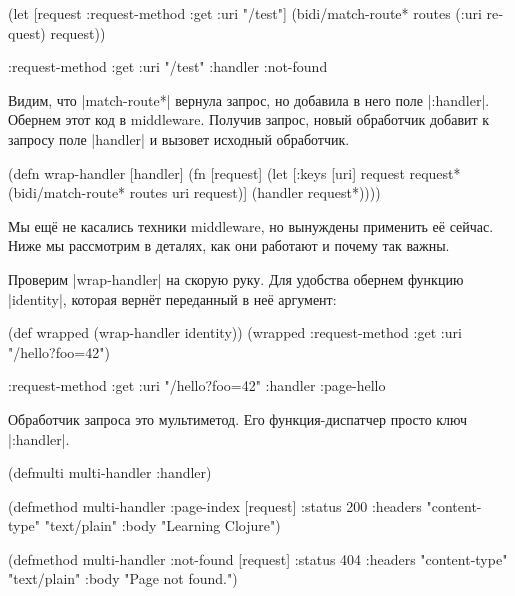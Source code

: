 \begin{english}
  \begin{clojure}
(let [request {:request-method :get
               :uri "/test"}]
  (bidi/match-route* routes (:uri request) request))

{:request-method :get
 :uri "/test"
 :handler :not-found}
  \end{clojure}
\end{english}

Видим, что \spverb|match-route*| вернула запрос, но добавила в него поле
\spverb|:handler|. Обернем этот код в middleware. Получив запрос, новый
обработчик добавит к запросу поле \spverb|handler| и вызовет исходный
обработчик.

\begin{english}
  \begin{clojure}
(defn wrap-handler [handler]
  (fn [request]
    (let [{:keys [uri]} request
          request* (bidi/match-route* routes uri request)]
      (handler request*))))
  \end{clojure}
\end{english}

Мы ещ\"{е} не касались техники middleware, но вынуждены применить е\"{е} сейчас. Ниже мы
рассмотрим в деталях, как они работают и почему так важны.

Проверим \spverb|wrap-handler| на скорую руку. Для удобства обернем функцию
\spverb|identity|, которая верн\"{е}т переданный в не\"{е} аргумент:

\begin{english}
  \begin{clojure}
(def wrapped (wrap-handler identity))
(wrapped {:request-method :get
          :uri "/hello?foo=42"})

{:request-method :get
 :uri "/hello?foo=42"
 :handler :page-hello}
  \end{clojure}
\end{english}


Обработчик запроса это мультиметод. Его функция-диспатчер просто ключ
\spverb|:handler|.

\begin{english}
  \begin{clojure}
(defmulti multi-handler :handler)

(defmethod multi-handler :page-index
  [request]
  {:status 200
   :headers {"content-type" "text/plain"}
   :body "Learning Clojure"})

(defmethod multi-handler :not-found
  [request]
  {:status 404
   :headers {"content-type" "text/plain"}
   :body "Page not found."})
  \end{clojure}
\end{english}

